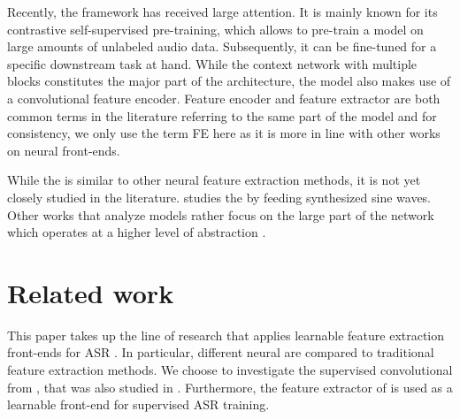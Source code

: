 \documentclass{INTERSPEECH2023}
\begin{document}
Recently, the \wvtwo framework \cite{facebook2020wav2vec2} has received large attention.
It is mainly known for its contrastive self-supervised pre-training, which allows to pre-train a model on large amounts of unlabeled audio data.
Subsequently, it can be fine-tuned for a specific downstream task at hand.
While the context network with multiple \transformer blocks constitutes the major part of the architecture, the \wvtwo model also makes use of a convolutional feature encoder.
Feature encoder \cite{facebook2020wav2vec2, facebook2020xlsr} and feature extractor \cite{asapp2022performance, vyas2022ondemand} are both common terms in the literature referring to the same part of the model and for consistency, we only use the term \acrfull{FE} here as it is more in line with other works on neural front-ends.

While the \wvtwo \fe is similar to other neural feature extraction methods, it is not yet closely studied in the literature.
\cite{choi2022w2v2fe} studies the \fe by feeding synthesized sine waves.
Other works that analyze \wvtwo models rather focus on the large \transformer part of the network which operates at a higher level of abstraction \cite{livescu2021wav2vec_analysis, fan21wvspeakerid, li2023exploration, dieck2022wav2vec}.


\section{Related work}
This paper takes up the line of research that applies learnable feature extraction front-ends for \gls{ASR} \cite{palaz2015convolutional, golik15:cnn, tuske2018:waveform, ravanelli2018sincnet, sainath2015cldnn}.
In particular, different neural \fes are compared to traditional feature extraction methods.
We choose to investigate the supervised convolutional \fe from \cite{tuske2018:waveform}, that was also studied in \cite{vieting2021waveform}.
Furthermore, the feature extractor of \wvtwo \cite{facebook2020wav2vec2} is used as a learnable front-end for supervised \gls{ASR} training.
\end{document}
